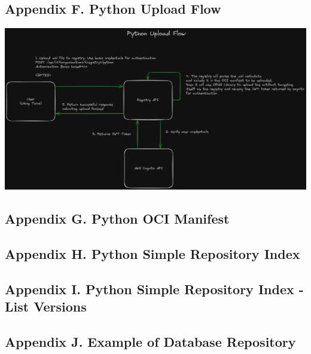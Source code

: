 \documentclass{article}
\begin{document}
  \subsection{Appendix F. Python Upload Flow}
  \label{sec:appendix-f}

  \includegraphics[scale=0.25]{appendix/python-upload-flow.png}

  \subsection{Appendix G. Python OCI Manifest}
  \label{sec:appendix-g}

  

  \subsection{Appendix H. Python Simple Repository Index}
  \label{sec:appendix-h}

  

  \subsection{Appendix I. Python Simple Repository Index - List Versions}
  \label{sec:appendix-i}

  

  \subsection{Appendix J. Example of Database Repository}
  \label{sec:appendix-j}
\end{document}
